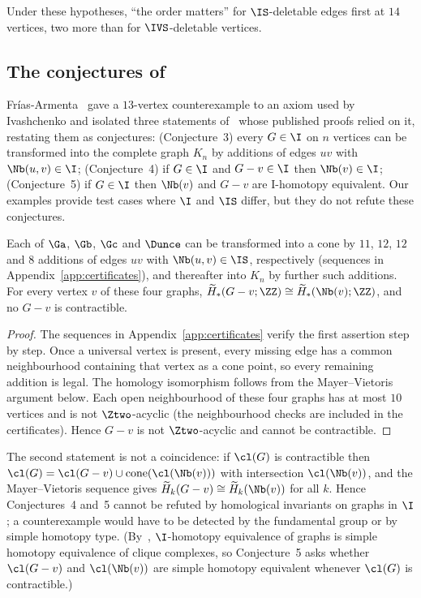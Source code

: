 Under these hypotheses, ``the order matters'' for $\IS$-deletable edges first at $14$ vertices, two more than for $\IVS$-deletable vertices.

\subsection{\texorpdfstring{The conjectures of~\cite{FriasArmenta2020}}{The conjectures of Frías-Armenta (2020)}}

Fr\'ias-Armenta~\cite{FriasArmenta2020} gave a $13$-vertex counterexample to an axiom used by Ivashchenko and isolated three statements of~\cite{Ivashchenko1994b} whose published proofs relied on it, restating them as conjectures: (Conjecture~3) every $G\in\I$ on $n$ vertices can be transformed into the complete graph $K_n$ by additions of edges $uv$ with $\Nb(u,v)\in\I$; (Conjecture~4) if $G\in\I$ and $G-v\in\I$ then $\Nb(v)\in\I$; (Conjecture~5) if $G\in\I$ then $\Nb(v)$ and $G-v$ are I-homotopy equivalent. Our examples provide test cases where $\I$ and $\IS$ differ, but they do not refute these conjectures.

\begin{proposition}\label{prop:frias}
Each of $\Ga$, $\Gb$, $\Gc$ and $\Dunce$ can be transformed into a cone by $11$, $12$, $12$ and $8$ additions of edges $uv$ with $\Nb(u,v)\in\IS$, respectively (sequences in Appendix~\ref{app:certificates}), and thereafter into $K_n$ by further such additions. For every vertex $v$ of these four graphs, $\widetilde H_*(G-v;\ZZ)\cong\widetilde H_*(\Nb(v);\ZZ)$, and no $G-v$ is contractible.
\end{proposition}
\begin{proof}
The sequences in Appendix~\ref{app:certificates} verify the first assertion step by step. Once a universal vertex is present, every missing edge has a common neighbourhood containing that vertex as a cone point, so every remaining addition is legal. The homology isomorphism follows from the Mayer--Vietoris argument below. Each open neighbourhood of these four graphs has at most $10$ vertices and is not $\Ztwo$-acyclic (the neighbourhood checks are included in the certificates). Hence $G-v$ is not $\Ztwo$-acyclic and cannot be contractible.
\end{proof}

The second statement is not a coincidence: if $\cl(G)$ is contractible then $\cl(G)=\cl(G-v)\cup\mathrm{cone}(\cl(\Nb(v)))$ with intersection $\cl(\Nb(v))$, and the Mayer--Vietoris sequence gives $\widetilde H_k(G-v)\cong\widetilde H_k(\Nb(v))$ for all $k$. Hence Conjectures~4 and~5 cannot be refuted by homological invariants on graphs in $\I$; a counterexample would have to be detected by the fundamental group or by simple homotopy type. (By~\cite[Theorem~1.2]{DochtermannMatsushita2025}, $\I$-homotopy equivalence of graphs is simple homotopy equivalence of clique complexes, so Conjecture~5 asks whether $\cl(G-v)$ and $\cl(\Nb(v))$ are simple homotopy equivalent whenever $\cl(G)$ is contractible.)

